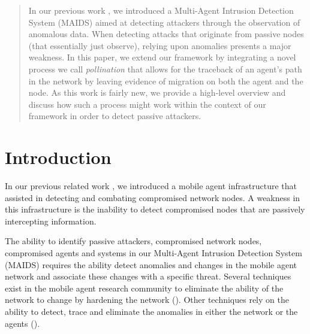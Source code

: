 \documentclass{acm_proc_article-sp}
\begin{document}
\maketitle
\begin{abstract}
In our previous work \cite{kackley09}, we introduced a Multi-Agent Intrusion Detection System (MAIDS) aimed at detecting attackers through the observation of anomalous data.  When detecting attacks that originate from passive nodes (that essentially just observe), relying upon anomalies presents a major weakness.  In this paper, we extend our framework by integrating a novel process we call {\it pollination} that allows for the traceback of an agent's path in the network by leaving evidence of migration on both the agent and the node.  As this work is fairly new, we provide a high-level overview and discuss how such a process might work within the context of our framework in order to detect passive attackers.
\end{abstract}




\section{Introduction}

In our previous related work \cite{kackley09}, we introduced a mobile agent infrastructure that assisted in detecting and combating compromised network nodes.  A weakness in this infrastructure is the inability to detect compromised nodes that are passively intercepting information.

The ability to identify passive attackers, compromised network nodes, compromised agents and systems in our Multi-Agent Intrusion Detection System (MAIDS) requires the ability detect anomalies and changes in the mobile agent network and associate these changes with a specific threat.  Several techniques exist in the mobile agent research community to eliminate the ability of the network to change by hardening the network (\cite{}).  Other techniques rely on the ability to detect, trace and eliminate the anomalies in either the network or the agents (\cite{}).
\end{document}
